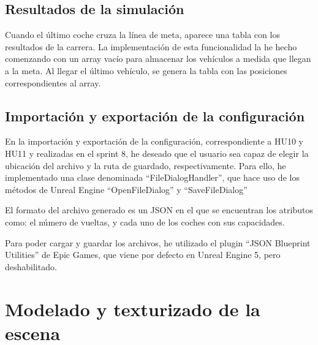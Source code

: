 \subsection{Resultados de la simulación}


Cuando el último coche cruza la línea de meta, aparece una tabla con los resultados de la carrera. La implementación de esta funcionalidad la he hecho comenzando con un array vacío para almacenar los vehículos a medida que llegan a la meta. Al llegar el último vehículo, se genera la tabla con las posiciones correspondientes al array.


\subsection{Importación y exportación de la configuración}

En la importación y exportación de la configuración, correspondiente a HU10 y HU11 y realizadas en el sprint 8, he deseado que el usuario sea capaz de elegir la ubicación del archivo y la ruta de guardado, respectivamente. Para ello, he implementado una clase denominada ``FileDialogHandler'', que hace uso de los métodos de Unreal Engine ``OpenFileDialog'' y ``SaveFileDialog''

\bigskip

El formato del archivo generado es un JSON en el que se encuentran los atributos como: el número de vueltas, y cada uno de los coches con sus capacidades.

\bigskip

Para poder cargar y guardar los archivos, he utilizado el plugin ``JSON Blueprint Utilities'' de Epic Games, que viene por defecto en Unreal Engine 5, pero deshabilitado.


\section{Modelado y texturizado de la escena}

